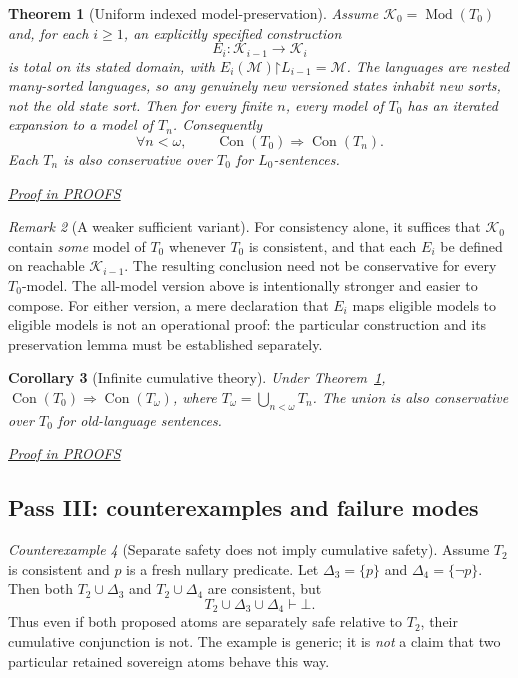 \documentclass[11pt,letterpaper]{article}
\newtheorem{theorem}{Theorem}[section]
\newtheorem{corollary}[theorem]{Corollary}
\theoremstyle{definition}\newtheorem{definition}[theorem]{Definition}\newtheorem{example}[theorem]{Example}
\theoremstyle{remark}\newtheorem{remark}[theorem]{Remark}
\newcommand{\Con}{\operatorname{Con}}
\newcommand{\Mod}{\operatorname{Mod}}
\newcommand{\prooflink}[1]{\par\noindent\hfill\small\hyperref[#1]{\textit{Proof in PROOFS}}\normalsize}
\newtheorem{counterexample}[theorem]{Counterexample}
\providecommand{\restr}{\mathord{\upharpoonright}}
\begin{document}
\begin{theorem}[Uniform indexed model-preservation]\label{induct:thm:indexed}
Assume \(\mathcal K_0=\Mod(T_0)\) and, for each \(i\geq1\), an explicitly specified construction
\[
E_i:\mathcal K_{i-1}\longrightarrow\mathcal K_i
\]
is total on its stated domain, with \(E_i(\mathcal M)\restr L_{i-1}=\mathcal M\). The languages are nested many-sorted languages, so any genuinely new versioned states inhabit new sorts, not the old state sort. Then for every finite \(n\), every model of \(T_0\) has an iterated expansion to a model of \(T_n\). Consequently
\begin{equation}\label{induct:eq:result}
\forall n<\omega,\qquad
\Con(T_0)\Longrightarrow\Con(T_n).
\end{equation}
Each \(T_n\) is also conservative over \(T_0\) for \(L_0\)-sentences.
\end{theorem}
\label{br:induct:stmt:4}\prooflink{br:induct:proof:4}


\begin{remark}[A weaker sufficient variant]
For consistency alone, it suffices that \(\mathcal K_0\) contain \emph{some} model of \(T_0\) whenever \(T_0\) is consistent, and that each \(E_i\) be defined on reachable \(\mathcal K_{i-1}\). The resulting conclusion need not be conservative for every \(T_0\)-model. The all-model version above is intentionally stronger and easier to compose. For either version, a mere declaration that $E_i$ maps eligible models to eligible models is not an operational proof: the particular construction and its preservation lemma must be established separately.
\end{remark}

\begin{corollary}[Infinite cumulative theory]\label{induct:cor:omega}
Under Theorem~\ref{induct:thm:indexed}, \(\Con(T_0)\Rightarrow\Con(T_\omega)\), where \(T_\omega=\bigcup_{n<\omega}T_n\). The union is also conservative over $T_0$ for old-language sentences.
\end{corollary}
\label{br:induct:stmt:5}\prooflink{br:induct:proof:5}


\subsection{Pass III: counterexamples and failure modes}

\begin{counterexample}[Separate safety does not imply cumulative safety]\label{induct:cx:pn}
Assume \(T_2\) is consistent and \(p\) is a fresh nullary predicate. Let \(\Delta_3=\{p\}\) and \(\Delta_4=\{\neg p\}\). Then both \(T_2\cup\Delta_3\) and \(T_2\cup\Delta_4\) are consistent, but
\[
T_2\cup\Delta_3\cup\Delta_4\vdash\bot.
\]
Thus even if both proposed atoms are separately safe relative to \(T_2\), their cumulative conjunction is not. The example is generic; it is \emph{not} a claim that two particular retained sovereign atoms behave this way.
\end{counterexample}
\end{document}
